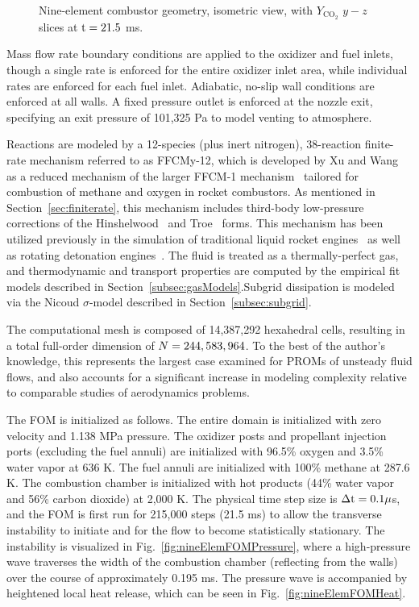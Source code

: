 \begin{figure}
\begin{minipage}{0.49\linewidth}
		\fi
		\caption{\label{fig:nineElemGeomIso}Nine-element combustor geometry, isometric view, with $Y_{\text{CO}_2}$ $y-z$ slices at $\text{t} = 21.5$ ms.}
	\end{minipage}
\end{figure}

Mass flow rate boundary conditions are applied to the oxidizer and fuel inlets, though a single rate is enforced for the entire oxidizer inlet area, while individual rates are enforced for each fuel inlet. Adiabatic, no-slip wall conditions are enforced at all walls. A fixed pressure outlet is enforced at the nozzle exit, specifying an exit pressure of 101,325 Pa to model venting to atmosphere.

Reactions are modeled by a 12-species (plus inert nitrogen), 38-reaction finite-rate mechanism referred to as FFCMy-12, which is developed by Xu and Wang~\cite{Wang2018,Xu2018} as a reduced mechanism of the larger FFCM-1 mechanism~\cite{ffcm1} tailored for combustion of methane and oxygen in rocket combustors. As mentioned in Section~\ref{sec:finiterate}, this mechanism includes third-body low-pressure corrections of the Hinshelwood~\cite{Hinshelwood1926} and Troe~\cite{Gilbert1983} forms. This mechanism has been utilized previously in the simulation of traditional liquid rocket engines~\cite{Harvazinski2020,Harvazinski2021} as well as rotating detonation engines~\cite{Prakash2021,Batista2021}. The fluid is treated as a thermally-perfect gas, and thermodynamic and transport properties are computed by the empirical fit models described in Section~\ref{subsec:gasModels}.Subgrid dissipation is modeled via the Nicoud $\sigma$-model described in Section~\ref{subsec:subgrid}.

The computational mesh is composed of 14,387,292 hexahedral cells, resulting in a total full-order dimension of $N = 244,583,964$. To the best of the author's knowledge, this represents the largest case examined for PROMs of unsteady fluid flows, and also accounts for a significant increase in modeling complexity relative to comparable studies of aerodynamics problems.

The FOM is initialized as follows. The entire domain is initialized with zero velocity and 1.138 MPa pressure. The oxidizer posts and propellant injection ports (excluding the fuel annuli) are initialized with 96.5\% oxygen and 3.5\% water vapor at 636 K. The fuel annuli are initialized with 100\% methane at 287.6 K. The combustion chamber is initialized with hot products (44\% water vapor and 56\% carbon dioxide) at 2,000 K. The physical time step size is $\Delta \text{t} = 0.1 \mu$s, and the FOM is first run for 215,000 steps (21.5 ms) to allow the transverse instability to initiate and for the flow to become statistically stationary. The instability is visualized in Fig.~\ref{fig:nineElemFOMPressure}, where a high-pressure wave traverses the width of the combustion chamber (reflecting from the walls) over the course of approximately 0.195 ms. The pressure wave is accompanied by heightened local heat release, which can be seen in Fig.~\ref{fig:nineElemFOMHeat}.

